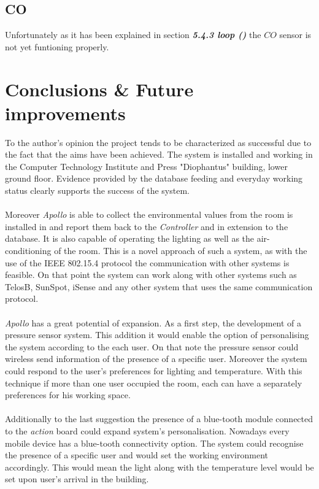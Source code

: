 \documentclass[12pt,a4paper]{report}
\begin{document}
\section{CO}
%
Unfortunately as it has been explained in section \textit{\textbf{5.4.3 loop ()}} the $CO$ sensor is not yet funtioning properly.
\newpage
%
\chapter{Conclusions \& Future improvements}
%
To the author's opinion the project tends to be characterized as successful due to the fact that the aims have been achieved. The system is installed and working in the Computer Technology Institute and Press "Diophantus" building, lower ground floor. Evidence provided by the database feeding and everyday working status clearly supports the success of the system.\\
\ \\
Moreover \emph{Apollo} is able to collect the environmental values from the room is installed in and report them back to the \textit{Controller} and in extension to the database. It is also capable of operating the lighting as well as the air-conditioning of the room. This is a novel approach of such a system, as with the use of the IEEE 802.15.4 protocol the communication with other systems is feasible. On that point the system can work along with other systems such as TelosB, SunSpot, iSense and any other system that uses the same communication protocol. \\
\ \\
\emph{Apollo} has a great potential of expansion. As a first step, the development of a pressure sensor system. This addition it would enable the option of personalising the system according to the each user. On that note the pressure sensor could wireless send information of the presence of a specific user. Moreover the system could respond to the user's preferences for lighting and temperature. With this technique if more than one user occupied the room, each can have a separately preferences for his working space.\\
\ \\
Additionally to the last suggestion the presence of a blue-tooth module connected to the \textit{action} board could expand system's personalisation. Nowadays every mobile device has a blue-tooth connectivity option. The system could recognise the presence of a specific user and would set the working environment accordingly. This would mean the light along with the temperature level would be set upon user's arrival in the building. \\
\end{document}
